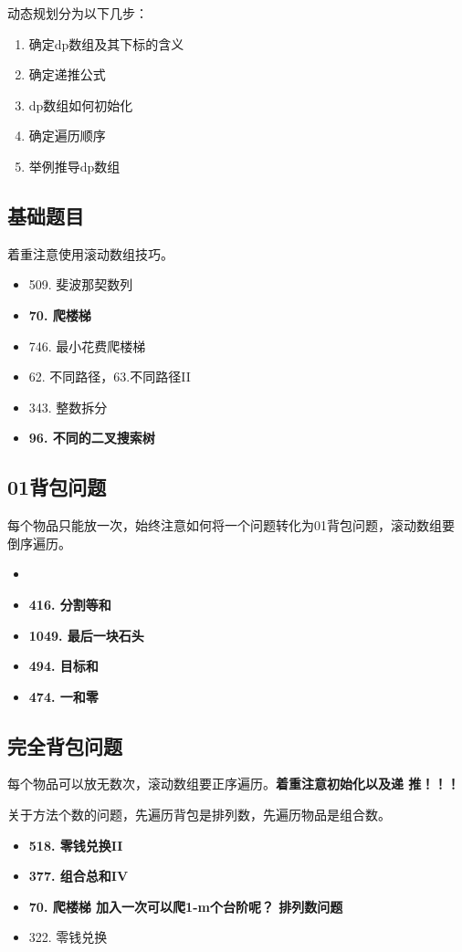 \documentclass[a4paper,twoside]{ctexart}
\begin{document}
动态规划分为以下几步：
\begin{enumerate}
\item 确定dp数组及其下标的含义
\item 确定递推公式
\item dp数组如何初始化
\item 确定遍历顺序
\item 举例推导dp数组
\end{enumerate}

\subsection{基础题目}
着重注意使用滚动数组技巧。

\begin{itemize}
\item 509. 斐波那契数列
\item \textbf{70. 爬楼梯}
\item 746. 最小花费爬楼梯
\item 62. 不同路径，63.不同路径II
\item 343. 整数拆分
\item \textbf{96. 不同的二叉搜索树}
\end{itemize}

\subsection{01背包问题}
每个物品只能放一次，始终注意如何将一个问题转化为01背包问题，滚动数组要
倒序遍历。

\begin{itemize}
\item \item \textbf{416. 分割等和}
\item \textbf{1049. 最后一块石头}
\item \textbf{494. 目标和}
\item \textbf{474. 一和零}
\end{itemize}

\subsection{完全背包问题}
每个物品可以放无数次，滚动数组要正序遍历。\textbf{着重注意初始化以及递
  推！！！}

关于方法个数的问题，先遍历背包是排列数，先遍历物品是组合数。

\begin{itemize}
\item \textbf{518. 零钱兑换II}
\item \textbf{377. 组合总和IV}
\item \textbf{70. 爬楼梯 加入一次可以爬1-m个台阶呢？ 排列数问题}
\item 322. 零钱兑换
\end{itemize}
\end{document}
